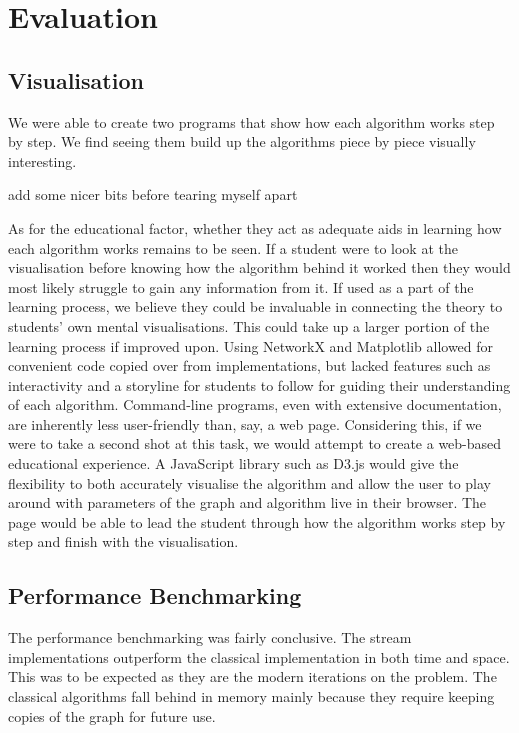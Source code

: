 \section{Evaluation}

\subsection{Visualisation}

We were able to create two programs that show how each algorithm works step by
step. We find seeing them build up the algorithms piece by piece visually
interesting.

add some nicer bits before tearing myself apart

As for the educational factor, whether they act as adequate aids in learning
how each algorithm works remains to be seen. If a student were to look at the
visualisation before knowing how the algorithm behind it worked then they would
most likely struggle to gain any information from it. If used as a part of the
learning process, we believe they could be invaluable in connecting the theory
to students' own mental visualisations. This could take up a larger portion of
the learning process if improved upon. Using NetworkX and Matplotlib allowed
for convenient code copied over from implementations, but lacked features such
as interactivity and a storyline for students to follow for guiding their
understanding of each algorithm. Command-line programs, even with extensive
documentation, are inherently less user-friendly than, say, a web page.
Considering this, if we were to take a second shot at this task, we would
attempt to create a web-based educational experience. A JavaScript library such
as D3.js \cite{bostock2011d3} would give the flexibility to both accurately
visualise the algorithm and allow the user to play around with parameters of
the graph and algorithm live in their browser. The page would be able to lead
the student through how the algorithm works step by step and finish with the
visualisation.

\subsection{Performance Benchmarking}

The performance benchmarking was fairly conclusive. The stream implementations
outperform the classical implementation in both time and space. This was to be
expected as they are the modern iterations on the problem. The classical
algorithms fall behind in memory mainly because they require keeping copies of
the graph for future use.

